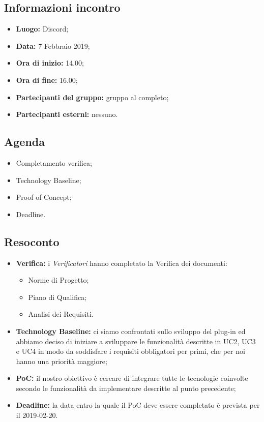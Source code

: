 \subsection{Informazioni incontro}
\begin{itemize}
	\item { \textbf{Luogo:} Discord};
	\item { \textbf{Data:} 7 Febbraio 2019};
	\item { \textbf{Ora di inizio:} 14.00};
	\item { \textbf{Ora di fine:} 16.00};
	\item { \textbf{Partecipanti del gruppo:} gruppo al completo};
	\item { \textbf{Partecipanti esterni:} nessuno}.
\end{itemize}


\subsection{Agenda}
\begin{itemize}
	\item {Completamento verifica;}
	\item {Technology Baseline;}
	\item {Proof of Concept;}
	\item {Deadline.}
\end{itemize}

\subsection{Resoconto}
\begin{itemize}
	\item { \textbf{Verifica:} i \emph{Verificatori} hanno completato la Verifica dei documenti:
	\begin{itemize}
		\item Norme di Progetto;
		\item Piano di Qualifica;
		\item Analisi dei Requisiti.
	\end{itemize}}
	\item { \textbf{Technology Baseline:} ci siamo confrontati sullo sviluppo del plug-in ed abbiamo deciso di iniziare a sviluppare le funzionalità descritte in UC2, UC3 e UC4 in modo da soddisfare i requisiti obbligatori per primi, che per noi hanno una priorità maggiore;}
	\item { \textbf{PoC:} il nostro obiettivo è cercare di integrare tutte le tecnologie coinvolte secondo le funzionalità da implementare descritte al punto precedente;}	
	\item { \textbf{Deadline:} la data entro la quale il PoC deve essere completato è prevista per il 2019-02-20.}
\end{itemize}

